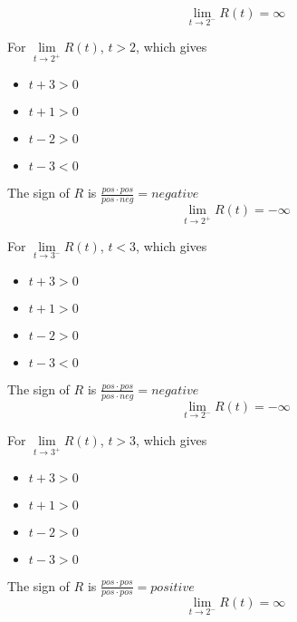 \documentclass{ximera}
\begin{document}
\begin{example}
\begin{explanation}
\[
\lim\limits_{t \to 2^-}R(t) = \infty
\]






For $\lim\limits_{t \to 2^+}R(t)$,  $t > 2$, which gives

\begin{itemize}
\item $t + 3 > 0$
\item $t + 1 > 0$
\item $t - 2 > 0$
\item $t - 3 < 0$
\end{itemize}


The sign of $R$ is $\frac{pos \cdot pos}{pos \cdot neg} = negative$ \\



\[
\lim\limits_{t \to 2^+}R(t) = -\infty
\]





For $\lim\limits_{t \to 3^-}R(t)$,  $t < 3$, which gives

\begin{itemize}
\item $t + 3 > 0$
\item $t + 1 > 0$
\item $t - 2 > 0$
\item $t - 3 < 0$
\end{itemize}


The sign of $R$ is $\frac{pos \cdot pos}{pos \cdot neg} = negative$ \\



\[
\lim\limits_{t \to 2^-}R(t) = -\infty
\]







For $\lim\limits_{t \to 3^+}R(t)$,  $t > 3$, which gives

\begin{itemize}
\item $t + 3 > 0$
\item $t + 1 > 0$
\item $t - 2 > 0$
\item $t - 3 > 0$
\end{itemize}


The sign of $R$ is $\frac{pos \cdot pos}{pos \cdot pos} = positive$ \\



\[
\lim\limits_{t \to 2^-}R(t) = \infty
\]









\end{explanation}
\end{example}
\end{document}

